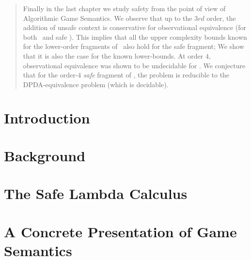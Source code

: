 \documentclass[11pt,a4paper,twoside,openright,draft]{myown}
\begin{document}
\begin{abstract}
Finally in the last chapter we study safety from the point of view of Algorithmic Game Semantics.  We observe that up to the $3rd$ order, the addition of unsafe context is conservative for observational equivalence (for both \ialgol\ and safe \ialgol). This implies that all the upper complexity bounds known for the lower-order fragments of \ialgol\ also hold for the safe fragment; We show that it is also the case for the known lower-bounds. At order $4$, observational equivalence was shown to be undecidable for \ialgol.
We conjecture that for the order-$4$ \emph{safe} fragment of \ialgol, the problem is reducible to the DPDA-equivalence problem (which is decidable).

\end{abstract}

\begin{romanpages}
\tableofcontents
\listoffigures
\listoftables
\end{romanpages}

\ifdraftmode\listoftodos\bigskip\fi

%

\chapter{Introduction}
    


\chapter{Background}
\label{chap:background}
    

\chapter{The Safe Lambda Calculus}
\label{chap:safelambda}
    
    
    
    
    
    
    


\chapter{A Concrete Presentation of Game Semantics}
    \label{chap:concrete_gamesem}
    
\end{document}
